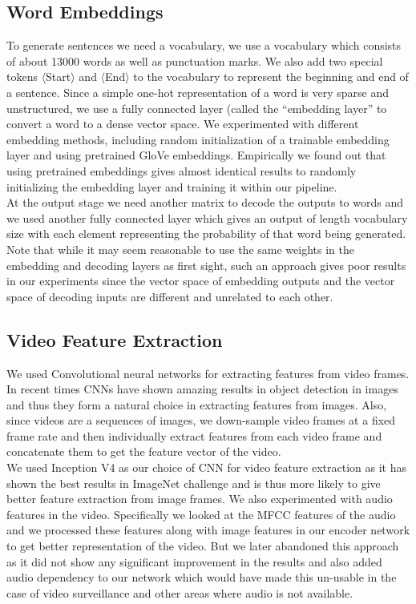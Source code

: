 \documentclass[12pt]{article}
\begin{document}
				
\subsection{Word Embeddings}
To generate sentences we need a vocabulary, we use a vocabulary which consists of about 13000 words as well as punctuation marks. We also add two special tokens $\langle$Start$\rangle$ and $\langle$End$\rangle$ to the vocabulary to represent the beginning and end of a sentence. Since a simple one-hot representation of a word is very sparse and unstructured, we use a fully connected layer (called the ``embedding layer'' to convert a word to a dense vector space. We experimented with different embedding methods, including random initialization of a trainable embedding layer and using pretrained GloVe\cite{glove} embeddings. Empirically we found out that using pretrained embeddings gives almost identical results to randomly initializing the embedding layer and training it within our pipeline.\\
At the output stage we need another matrix to decode the outputs to words and we used another fully connected layer which gives an output of length vocabulary size with each element representing the probability of that word being generated. Note that while it may seem reasonable to use the same weights in the embedding and decoding layers as first sight, such an approach gives poor results in our experiments since the vector space of embedding outputs and the vector space of decoding inputs are different and unrelated to each other.

\subsection{Video Feature Extraction}

	We used Convolutional neural networks for extracting features from video frames. In recent times CNNs have shown amazing results in object
	detection in images and thus they form a natural choice in extracting features from images. Also, since videos are a sequences of images, we
	down-sample video frames at a fixed frame rate and then individually extract features from each video frame and concatenate them to get 
	the feature vector of the video.\\
	We used Inception V4\cite{inceptionv4} as our choice of CNN for video feature extraction as it has shown the best results in ImageNet challenge and is thus
	more likely to give better feature extraction from image frames. We also experimented with audio features in the video. Specifically we looked
	at the MFCC features\cite{audio} of the audio and we processed these features along with image features in our encoder network to get better representation
	of the video. But we later abandoned this approach as it did not show any significant improvement in the results and also added audio dependency
	to our network which would have made this un-usable in the case of video surveillance and other areas where audio is not available.
	
\end{document}
